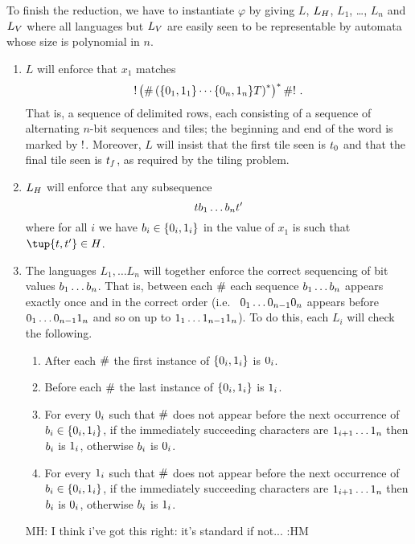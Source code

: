 \documentclass{article}
\newcommand{\mat}[1]{\color{cyan} {MH: #1 :HM} \color{black}}
\begin{document}
To finish the reduction, we have to instantiate $\varphi$ by giving
$L$, $L_\hcons$, $L_1$, \ldots, $L_n$ and $L_\vcons$ where all languages but $L_\vcons$ are easily seen to be representable by automata whose size is polynomial in $n$.
\begin{enumerate}
\item
    $L$ will enforce that $x_1$ matches
    \[
        \resetchar
        \brac{
            \rowdelim
            \brac{
                \set{\nbit{1}{0},\nbit{1}{1}}
                \cdots
                \set{\nbit{n}{0},\nbit{n}{1}}
                \tiles
            }^\ast
        }^\ast
        \rowdelim
        \resetchar \ .
    \]
    That is, a sequence of delimited rows, each consisting of a sequence of alternating $n$-bit sequences and tiles;
    the beginning and end of the word is marked by $\resetchar$.
    Moreover, $L$ will insist that the first tile seen is $\inittile$ and that the final tile seen is $\fintile$, as required by the tiling problem.

\item
    $L_\hcons$ will enforce that any subsequence
    \[
        \tile \bit_1 \ldots \bit_n \tile'
    \]
    where for all $i$ we have
    $\bit_i \in \set{\nbit{i}{0}, \nbit{i}{1}}$
    in the value of $x_1$ is such that $\tup{\tile, \tile'} \in \hcons$.

\item
    The languages $L_1, \ldots L_n$ will together enforce the correct sequencing of bit values $\bit_1 \ldots \bit_n$.
    That is, between each $\rowdelim$ each sequence $\bit_1 \ldots \bit_n$ appears exactly once and in the correct order
    (i.e.\ %
    $\nbit{1}{0}\ldots\nbit{n-1}{0}\nbit{n}{0}$
    appears before
    $\nbit{1}{0}\ldots\nbit{n-1}{0}\nbit{n}{1}$
    and so on up to
    $\nbit{1}{1}\ldots\nbit{n-1}{1}\nbit{n}{1}$).
    To do this, each $L_i$ will check the following.
    \begin{enumerate}
    \item
        After each $\rowdelim$ the first instance of
        $\set{\nbit{i}{0},\nbit{i}{1}}$
        is $\nbit{i}{0}$.
    \item
        Before each $\rowdelim$ the last instance of
        $\set{\nbit{i}{0},\nbit{i}{1}}$
        is $\nbit{i}{1}$.
    \item
        For every $\nbit{i}{0}$ such that
        $\rowdelim$ does not appear before the next occurrence of
        $\bit_i \in \set{\nbit{i}{0},\nbit{i}{1}}$,
        if the immediately succeeding characters are
        $\nbit{i+1}{1}\ldots\nbit{n}{1}$
        then $\bit_i$ is $\nbit{i}{1}$,
        otherwise $\bit_i$ is $\nbit{i}{0}$.
    \item
        For every $\nbit{i}{1}$ such that
        $\rowdelim$ does not appear before the next occurrence of
        $\bit_i \in \set{\nbit{i}{0},\nbit{i}{1}}$,
        if the immediately succeeding characters are
        $\nbit{i+1}{1}\ldots\nbit{n}{1}$
        then $\bit_i$ is $\nbit{i}{0}$,
        otherwise $\bit_i$ is $\nbit{i}{1}$.
    \end{enumerate}
    \mat{I think i've got this right: it's standard if not...}
\end{enumerate}
\end{document}

